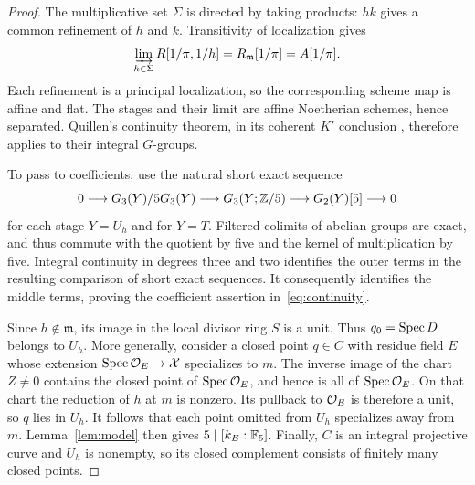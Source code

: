 \begin{proof}
The multiplicative set $\Sigma$ is directed by taking products:
$hk$ gives a common refinement of $h$ and $k$.  Transitivity of
localization gives
\[
 \varinjlim_{h\in\Sigma}R[1/\pi,1/h]
 =R_{\mathfrak m}[1/\pi]=A[1/\pi].
\]
Each refinement is a principal localization, so the corresponding
scheme map is affine and flat.  The stages and their limit are affine
Noetherian schemes, hence separated.  Quillen's continuity theorem,
in its coherent $K'$ conclusion
\cite[\S7, Proposition~2.2]{QuillenHigher}, therefore applies to
their integral $G$-groups.

To pass to coefficients, use the natural short exact sequence
\[
 0\longrightarrow G_3(Y)/5G_3(Y)
 \longrightarrow G_3(Y;\mathbb Z/5)
 \longrightarrow G_2(Y)[5]\longrightarrow0
\]
for each stage $Y=U_h$ and for $Y=T$.  Filtered colimits of abelian
groups are exact, and thus commute with the quotient by five and
the kernel of multiplication by five.  Integral continuity in
degrees three and two identifies the outer terms in the resulting
comparison of short exact sequences.  It consequently identifies
the middle terms, proving the coefficient assertion
in~\eqref{eq:continuity}.

Since $h\notin\mathfrak m$, its image in the local divisor ring $S$
is a unit.  Thus $q_0=\operatorname{Spec} D$ belongs to $U_h$.  More generally,
consider a closed point $q\in C$ with residue field $E$ whose
extension $\operatorname{Spec}\mathcal O_E\to\mathcal X$ specializes to $m$.
The inverse image of the chart $Z\ne0$ contains the closed point of
$\operatorname{Spec}\mathcal O_E$, and hence is all of $\operatorname{Spec}\mathcal O_E$.
On that chart the reduction of $h$ at $m$ is nonzero.  Its pullback
to $\mathcal O_E$ is therefore a unit, so $q$ lies in $U_h$.
It follows that each point omitted from $U_h$ specializes away
from $m$.  Lemma~\ref{lem:model} then gives
$5\mid[k_E:\mathbb F_5]$.  Finally, $C$ is an integral projective curve
and $U_h$ is nonempty, so its closed complement consists of
finitely many closed points.
\end{proof}

